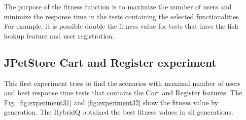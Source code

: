 The purpose of the fitness function is to maximize the number of users and minimize the response time in the tests containing the selected functionalities. For example, it is possible double the fitness value for tests that have the fish lookup feature and user registration.

\subsection{JPetStore  Cart and Register experiment }

This first experiment tries to find the scenarios with maximal number of users and best response time tests that contains the Cart and Register features. The Fig. \ref{fig:experiment31} and \ref{fig:experiment32} show the fitness value by generation. The HybridQ obtained the best fitness values in all generations.


